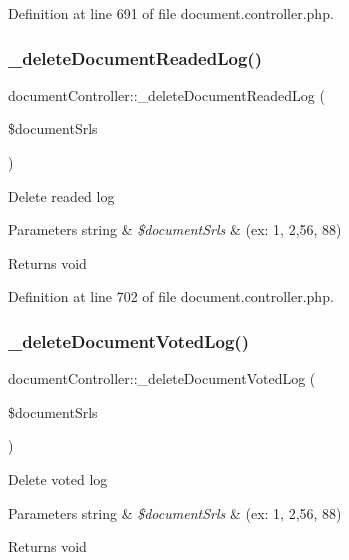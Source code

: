 Definition at line 691 of file document.\+controller.\+php.

\mbox{\label{classdocumentController_ac055fa2cc48de200d0b319eddd7a13da}} 
\subsubsection{\texorpdfstring{\+\_\+delete\+Document\+Readed\+Log()}{\_deleteDocumentReadedLog()}}
{\footnotesize\ttfamily document\+Controller\+::\+\_\+delete\+Document\+Readed\+Log (\begin{DoxyParamCaption}\item[{}]{\$document\+Srls }\end{DoxyParamCaption})}

Delete readed log 
\begin{DoxyParams}[1]{Parameters}
string & {\em \$document\+Srls} & (ex\+: 1, 2,56, 88) \\
\hline
\end{DoxyParams}
\begin{DoxyReturn}{Returns}
void 
\end{DoxyReturn}


Definition at line 702 of file document.\+controller.\+php.

\mbox{\label{classdocumentController_a9fe391d1b1ece3b7b16d15976c1622d0}} 
\subsubsection{\texorpdfstring{\+\_\+delete\+Document\+Voted\+Log()}{\_deleteDocumentVotedLog()}}
{\footnotesize\ttfamily document\+Controller\+::\+\_\+delete\+Document\+Voted\+Log (\begin{DoxyParamCaption}\item[{}]{\$document\+Srls }\end{DoxyParamCaption})}

Delete voted log 
\begin{DoxyParams}[1]{Parameters}
string & {\em \$document\+Srls} & (ex\+: 1, 2,56, 88) \\
\hline
\end{DoxyParams}
\begin{DoxyReturn}{Returns}
void 
\end{DoxyReturn}


